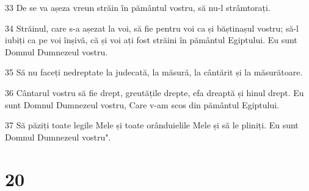 \par 33 De se va așeza vreun străin în pământul vostru, să nu-l strâmtorați.
\par 34 Străinul, care s-a așezat la voi, să fie pentru voi ca și băștinașul vostru; să-l iubiți ca pe voi înșivă, că și voi ați fost străini în pământul Egiptului. Eu sunt Domnul Dumnezeul vostru.
\par 35 Să nu faceți nedreptate la judecată, la măsură, la cântărit și la măsurătoare.
\par 36 Cântarul vostru să fie drept, greutățile drepte, efa dreaptă și hinul drept. Eu sunt Domnul Dumnezeul vostru, Care v-am scos din pământul Egiptului.
\par 37 Să păziți toate legile Mele și toate orânduielile Mele și să le pliniți. Eu sunt Domnul Dumnezeul vostru".

\chapter{20}

